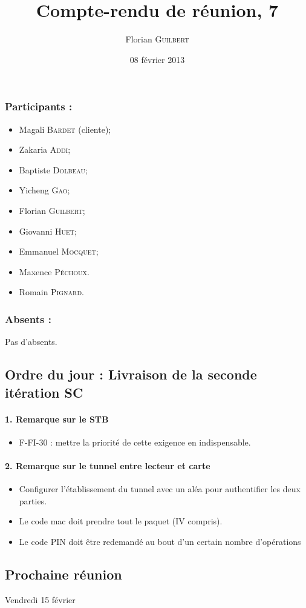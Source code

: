 \documentclass[a4paper,10pt]{article}
\author{Florian \textsc{Guilbert}}
\title{Compte-rendu de réunion, 7}
\date{08 février 2013}
\begin{document}
\maketitle

\subsubsection*{Participants : }
\begin{itemize}
    \item Magali \textsc{Bardet} (cliente);
    \item Zakaria \textsc{Addi};
    \item Baptiste \textsc{Dolbeau};
    \item Yicheng \textsc{Gao};
    \item Florian \textsc{Guilbert};
    \item Giovanni \textsc{Huet};
    \item Emmanuel \textsc{Mocquet};
    \item Maxence  \textsc{Péchoux}.
    \item Romain \textsc{Pignard}.
\end{itemize}

\subsubsection*{Absents : }
Pas d'absents.

\subsection*{Ordre du jour : Livraison de la seconde itération SC}

\paragraph{1. Remarque sur le STB}
\begin{itemize}
\item F-FI-30 : mettre la priorité de cette exigence en indispensable.
\end{itemize}

\paragraph{2. Remarque sur le tunnel entre lecteur et carte}

\begin{itemize}
\item Configurer l'établissement du tunnel avec un aléa pour authentifier les deux
parties.
\item Le code mac doit prendre tout le paquet (IV compris).
\item Le code PIN doit être redemandé au bout d'un certain nombre d'opérations
\end{itemize}

\subsection*{Prochaine réunion}
    Vendredi 15 février
    
\end{document}
